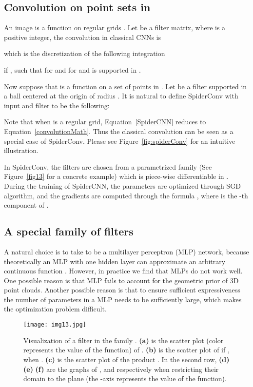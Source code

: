\documentclass[runningheads]{llncs}
\begin{document}
\subsection{Convolution on point sets in }

An image is a function on regular grids . Let  be a  filter matrix, where  is a positive integer, the convolution in classical CNNs is 

which is the discretization of the following integration

if , such that  for  and  for  and  is supported in . 

Now suppose that  is a function on a set of points  in . Let  be a filter supported in a ball centered at the origin of radius . It is natural to define SpiderConv with input  and filter  to be the following:

Note that when  is a regular grid, Equation~\ref{SpiderCNN} reduces to Equation~\ref{convolutionMath}.  Thus the classical convolution can be seen as a special case of SpiderConv. Please see Figure~\ref{fig:spiderConv} for an intuitive illustration.


In SpiderConv, the filters are chosen from a parametrized family  (See Figure~\ref{fig13} for a concrete example) which is piece-wise differentiable in . During the training of SpiderCNN, the parameters  are optimized through SGD algorithm, and the gradients are computed through the formula 
, 
where  is the -th component of .

\subsection{A special family of filters  } \label{TS}

A natural choice is to take  to be a multilayer perceptron (MLP) network, because theoretically an MLP with one hidden layer can approximate an arbitrary continuous function \cite{hornik1991approximation}. However, in practice we find that MLPs do not work well. 
One possible reason is that MLP fails to account for the geometric prior of 3D point clouds. Another possible reason is that to ensure sufficient expressiveness the number of parameters in a MLP needs to be sufficiently large, which makes the optimization problem difficult.

\begin{figure}
\centering
\texttt{[image: img13.jpg]} \label{fig13}
\caption{ 
Visualization of a filter in the family . {\bf (a)} is the scatter plot (color represents the value of the function) of . {\bf{(b)}}  is the scatter plot of  if , when . {\bf (c)} is the scatter plot of the product . In the second row, {\bf (d)} {\bf (e)} {\bf (f)} are  the graphs of  ,    and   respectively when restricting their domain to the plane  (the -axis represents the value of the function).
}
\label{fig:filters}
\end{figure}
\end{document}
